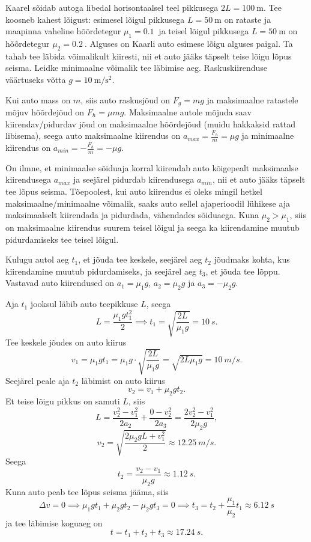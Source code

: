 
Kaarel sõidab autoga libedal horisontaalsel teel pikkusega $2L=\SI{100}{\m}$. Tee koosneb kahest lõigust: esimesel lõigul pikkusega $L=\SI{50}{\m}$ on rataste ja maapinna vaheline hõõrdetegur $\mu_1=\SI{0.1}{}$ ja teisel lõigul pikkusega $L=\SI{50}{\m}$ on hõõrdetegur $\mu_2=\SI{0.2}{}$. Alguses on Kaarli auto esimese lõigu alguses paigal. Ta tahab tee läbida võimalikult kiiresti, nii et auto jääks täpselt teise lõigu lõpus seisma. Leidke minimaalne võimalik tee läbimise aeg. Raskuskiirenduse väärtuseks võtta $g=\SI{10}{\m\per\s\squared}$.


\hint

\solu
Kui auto mass on $m$, siis auto raskusjõud on $F_g = mg$ ja maksimaalne ratastele mõjuv hõõrdejõud on $F_h = \mu mg$. Maksimaalne autole mõjuda saav kiirendav/pidurdav jõud on maksimaalne hõõrdejõud (muidu hakkaksid rattad libisema), seega auto maksimaalne kiirendus on $a_{max} = \frac{F_h}{m} = \mu g$ ja minimaalne kiirendus on $a_{min}=-\frac{F_h}{m}= -\mu g$.

On ilmne, et minimaalse sõiduaja korral kiirendab auto kõigepealt maksimaalse kiirendusega $a_{max}$ ja seejärel pidurdab kiirendusega $a_{min}$, nii et auto jääks täpselt tee lõpus seisma. Tõepoolest, kui auto kiirendus ei oleks mingil hetkel maksimaalne/minimaalne võimalik, saaks auto sellel ajaperioodil lühikese aja maksimaalselt kiirendada ja pidurdada, vähendades sõiduaega. Kuna $\mu_2 > \mu_1$, siis on maksimaalne kiirendus suurem teisel lõigul ja seega ka kiirendamine muutub pidurdamiseks tee teisel lõigul.

Kulugu autol aeg $t_1$, et jõuda tee keskele, seejärel aeg $t_2$ jõudmaks kohta, kus kiirendamine muutub pidurdamiseks, ja seejärel aeg $t_3$, et jõuda tee lõppu. Vastavad auto kiirendused on $a_1=\mu_1 g$, $a_2=\mu_2 g$ ja $a_3=-\mu_2 g$.

Aja $t_1$ jooksul läbib auto teepikkuse $L$, seega
\[
  L=\frac{\mu_1 g t_1^2}{2} \implies t_1 = \sqrt{\frac{2L}{\mu_1 g}} = \SI{10}{s}.
\]
Tee keskele jõudes on auto kiirus
\[
  v_1 = \mu_1 g t_1 = \mu_1 g \cdot \sqrt{\frac{2L}{\mu_1 g}} = \sqrt{2L\mu_1 g} = \SI{10}{m/s}.
\]
Seejärel peale aja $t_2$ läbimist on auto kiirus
\[
  v_2 = v_1 + \mu_2 g t_2.
\]
Et teise lõigu pikkus on samuti $L$, siis
\[
  L = \frac{v_2^2 - v_1^2}{2a_2} + \frac{0-v_2^2}{2a_3} = \frac{2v_2^2 - v_1^2}{2\mu_2 g},
\]
\[
  v_2 = \sqrt{\frac{2\mu_2 gL+v_1^2}{2}} \approx \SI{12.25}{m/s}.
\]
Seega
\[
  t_2 = \frac{v_2-v_1}{\mu_2 g} \approx \SI{1.12}{s}.
\]
Kuna auto peab tee lõpus seisma jääma, siis
\[
  \Delta v = 0 \implies \mu_1 g t_1 + \mu_2 g t_2 - \mu_2 g t_3 = 0 \implies t_3 = t_2 + \frac{\mu_1}{\mu_2}t_1 \approx \SI{6.12}{s}
\]
ja tee läbimise koguaeg on
\[
  t=t_1+t_2+t_3 \approx \SI{17,24}{s}.
\]
\probend